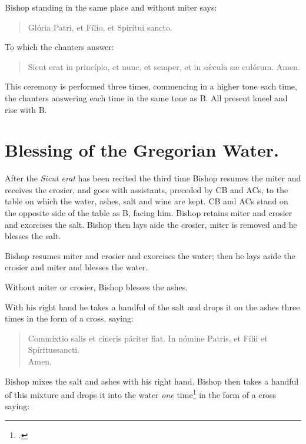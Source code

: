\documentclass[letterpaper]{report}
\begin{document}
{Bishop standing in the same place and without miter says:

\begin{quote}
    \vbar Glória Patri, et Fílio, et Spirítui sancto.
\end{quote}

To which the chanters answer:

\begin{quote}
    \rbar Sicut erat in princípio, et nunc, et semper, et in s\'\ae cula s\ae
    culórum. Amen.
\end{quote}

This ceremony is performed three times, commencing in a higher tone each time,
the chanters answering each time in the same tone as B. All present kneel and
rise with B. 

\section{Blessing of the Gregorian Water.}

\rubric After the \textit{Sicut erat} has been recited the third time Bishop resumes the
miter and receives the crosier, and goes with assistants, preceded by CB and
ACs, to the table on which the water, ashes, salt and wine are kept. CB and ACs
stand on the opposite side of the table as B, facing him. Bishop retains miter and
crosier and exorcises the salt. Bishop then lays aide the crosier, miter is removed
and he blesses the salt.

\rubric Bishop resumes miter and crosier and exorcises the water; then he lays aside
the crosier and miter and blesses the water. 

\rubric Without miter or crosier, Bishop blesses the ashes.

\rubric With his right hand he takes a handful of the salt and drops it on the
ashes three times in the form of a cross, saying:

\begin{quote}
   Commíxtio salis et cíneris páriter fiat. In nómine Pa\cross tris, et
    Fí\cross lii et Spíritus\cross sancti. \\
   \rbar Amen.
\end{quote}

Bishop mixes the salt and ashes with his right hand. Bishop then takes a handful of this
mixture and drops it into the water \textit{one} time\footcite[The Pontifical
seems to indicate that the bishop performs this ceremony \textit{three times,}
but the authors imply that it is done only \textit{once.}][footnote 1, p.
60.]{consecranda} in the form of a cross saying:

}
\end{document}
